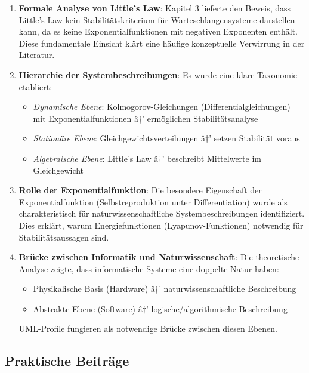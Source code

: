 ﻿\documentclass[a4paper,12pt]{report}
\theoremstyle{definition}
\begin{document}
\begin{enumerate}
	\item[-] \textbf{Formale Analyse von Little's Law}: Kapitel 3 lieferte den Beweis, dass Little's Law kein Stabilitätskriterium für Warteschlangensysteme darstellen kann, da es keine Exponentialfunktionen mit negativen Exponenten enthält. Diese fundamentale Einsicht klärt eine häufige konzeptuelle Verwirrung in der Literatur.
	
	\item[-] \textbf{Hierarchie der Systembeschreibungen}: Es wurde eine klare Taxonomie etabliert:
	\begin{itemize}
		\item[-] \textit{Dynamische Ebene}: Kolmogorov-Gleichungen (Differentialgleichungen) mit Exponentialfunktionen â†’ ermöglichen Stabilitätsanalyse
		\item[-] \textit{Stationäre Ebene}: Gleichgewichtsverteilungen â†’ setzen Stabilität voraus
		\item[-] \textit{Algebraische Ebene}: Little's Law â†’ beschreibt Mittelwerte im Gleichgewicht
	\end{itemize}
	
	\item[-] \textbf{Rolle der Exponentialfunktion}: Die besondere Eigenschaft der Exponentialfunktion (Selbstreproduktion unter Differentiation) wurde als charakteristisch für naturwissenschaftliche Systembeschreibungen identifiziert. Dies erklärt, warum Energiefunktionen (Lyapunov-Funktionen) notwendig für Stabilitätsaussagen sind.
	
	\item[-] \textbf{Brücke zwischen Informatik und Naturwissenschaft}: Die theoretische Analyse zeigte, dass informatische Systeme eine doppelte Natur haben:
	\begin{itemize}
		\item[-] Physikalische Basis (Hardware) â†’ naturwissenschaftliche Beschreibung
		\item[-] Abstrakte Ebene (Software) â†’ logische/algorithmische Beschreibung
	\end{itemize}
	UML-Profile fungieren als notwendige Brücke zwischen diesen Ebenen.
\end{enumerate}

\subsection{Praktische Beiträge}
\end{document}
